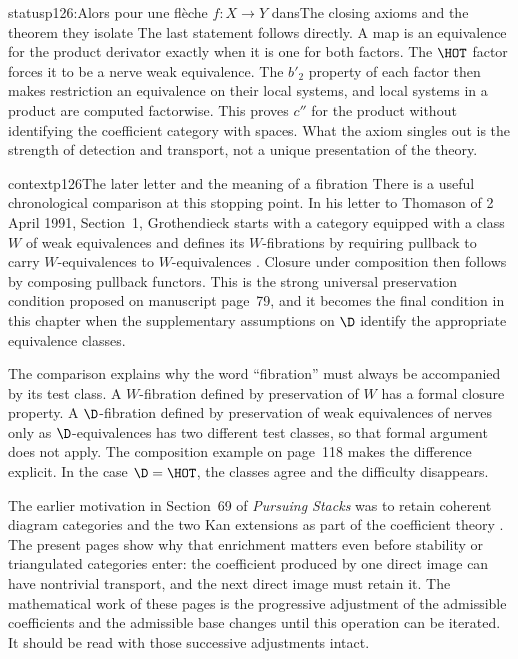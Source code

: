 \begin{dcomment}{status}{p126:Alors pour une flèche $f : X \to Y$ dans}{The closing axioms and the theorem they isolate}
The last statement follows directly. A map is an equivalence for the product derivator exactly when it is one for both factors. The $\HOT$ factor forces it to be a nerve weak equivalence. The $b'_2$ property of each factor then makes restriction an equivalence on their local systems, and local systems in a product are computed factorwise. This proves $c''$ for the product without identifying the coefficient category with spaces. What the axiom singles out is the strength of detection and transport, not a unique presentation of the theory.
\end{dcomment}

\begin{dcomment}{context}{p126}{The later letter and the meaning of a fibration}
There is a useful chronological comparison at this stopping point. In his letter to Thomason of 2 April 1991, Section~1, Grothendieck starts with a category equipped with a class $W$ of weak equivalences and defines its $W$-fibrations by requiring pullback to carry $W$-equivalences to $W$-equivalences \citep{Grothendieck1991Letter}. Closure under composition then follows by composing pullback functors. This is the strong universal preservation condition proposed on manuscript page~79, and it becomes the final condition in this chapter when the supplementary assumptions on $\D$ identify the appropriate equivalence classes.

The comparison explains why the word ``fibration'' must always be accompanied by its test class. A $W$-fibration defined by preservation of $W$ has a formal closure property. A $\D$-fibration defined by preservation of weak equivalences of nerves only as $\D$-equivalences has two different test classes, so that formal argument does not apply. The composition example on page~118 makes the difference explicit. In the case $\D=\HOT$, the classes agree and the difficulty disappears.

The earlier motivation in Section~69 of \emph{Pursuing Stacks} was to retain coherent diagram categories and the two Kan extensions as part of the coefficient theory \citep{Grothendieck1983}. The present pages show why that enrichment matters even before stability or triangulated categories enter: the coefficient produced by one direct image can have nontrivial transport, and the next direct image must retain it. The mathematical work of these pages is the progressive adjustment of the admissible coefficients and the admissible base changes until this operation can be iterated. It should be read with those successive adjustments intact.
\end{dcomment}
